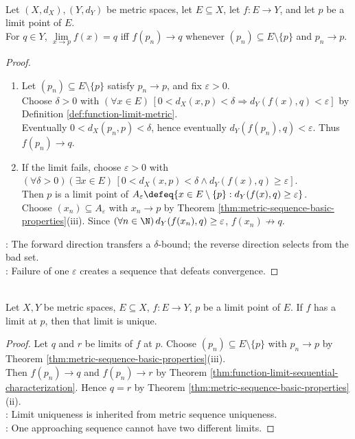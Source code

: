 \begin{theorem} \label{thm:function-limit-sequential-characterization} \\
Let $(X,d_X),(Y,d_Y)$ be metric spaces, let $E\subseteq X$, let $f:E\to Y$, and let $p$ be a limit point of $E$.\\
For $q\in Y$, $\lim\limits_{x\to p}f(x)=q$ iff $f(p_n)\to q$ whenever $(p_n)\subseteq E\setminus\{p\}$ and $p_n\to p$.
\begin{proof}
\begin{enumerate}[label=\roman*.]
\setlength{\itemsep}{0pt}
\item[$(\Rightarrow)$] Let $(p_n)\subseteq E\setminus\{p\}$ satisfy $p_n\to p$, and fix $\varepsilon>0$.\\
Choose $\delta>0$ with $(\forall x\in E)\,[0<d_X(x,p)<\delta\Longrightarrow d_Y(f(x),q)<\varepsilon]$ by Definition \ref{def:function-limit-metric}.\\
Eventually $0<d_X(p_n,p)<\delta$, hence eventually $d_Y(f(p_n),q)<\varepsilon$. Thus $f(p_n)\to q$.
\item[$(\Leftarrow)$] If the limit fails, choose $\varepsilon>0$ with $(\forall\delta>0)(\exists x\in E)\,[0<d_X(x,p)<\delta\land d_Y(f(x),q)\geq\varepsilon]$.\\
Then $p$ is a limit point of $A_\varepsilon\defeq\{x\in E\setminus\{p\}:d_Y(f(x),q)\geq\varepsilon\}$.\\
Choose $(x_n)\subseteq A_\varepsilon$ with $x_n\to p$ by Theorem \ref{thm:metric-sequence-basic-properties}(iii). Since $(\forall n\in\N)\,d_Y(f(x_n),q)\geq\varepsilon$, $f(x_n)\not\to q$.
\end{enumerate}
: The forward direction transfers a $\delta$-bound; the reverse direction selects from the bad set.\\
: Failure of one $\varepsilon$ creates a sequence that defeats convergence.
\end{proof}
\end{theorem}

\begin{corollary} \label{cor:function-limits-are-unique} \\
Let $X,Y$ be metric spaces, $E\subseteq X$, $f:E\to Y$, $p$ be a limit point of $E$. If $f$ has a limit at $p$, then that limit is unique.
\begin{proof}
Let $q$ and $r$ be limits of $f$ at $p$. Choose $(p_n)\subseteq E\setminus\{p\}$ with $p_n\to p$ by Theorem \ref{thm:metric-sequence-basic-properties}(iii).\\
Then $f(p_n)\to q$ and $f(p_n)\to r$ by Theorem \ref{thm:function-limit-sequential-characterization}. Hence $q=r$ by Theorem \ref{thm:metric-sequence-basic-properties}(ii).\\
: Limit uniqueness is inherited from metric sequence uniqueness.\\
: One approaching sequence cannot have two different limits.
\end{proof}
\end{corollary}

